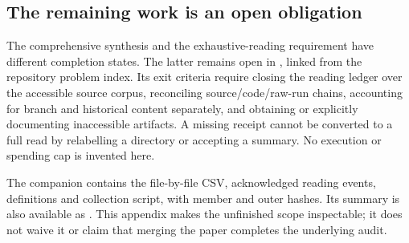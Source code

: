 \subsection{The remaining work is an open obligation}

The comprehensive synthesis and the exhaustive-reading requirement have
different completion states. The latter remains open in
, linked from the
repository problem index. Its exit criteria require closing the reading
ledger over the accessible source corpus, reconciling source/code/raw-run
chains, accounting for branch and historical content separately, and
obtaining or explicitly documenting inaccessible artifacts. A missing
receipt cannot be converted to a full read by relabelling a directory or
accepting a summary. No execution or spending cap is invented here.

The companion  contains the
file-by-file CSV, acknowledged reading events, definitions and collection
script, with member and outer hashes. Its summary is also available as
. This appendix makes the
unfinished scope inspectable; it does not waive it or claim that merging
the paper completes the underlying audit.
